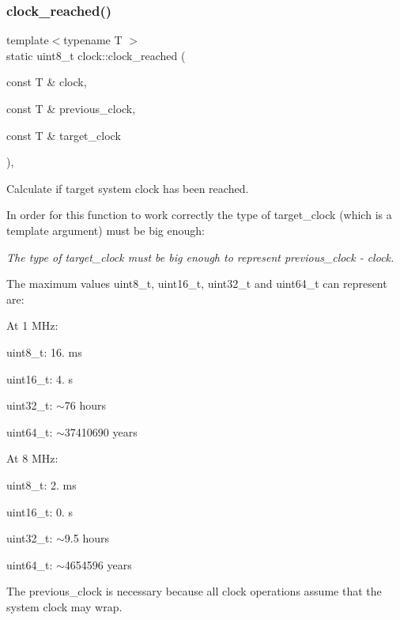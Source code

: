 \subsubsection{\texorpdfstring{clock\+\_\+reached()}{clock\_reached()}\hspace{0.1cm}{\footnotesize\ttfamily [1/2]}}
{\footnotesize\ttfamily template$<$typename T $>$ \\
static uint8\+\_\+t clock\+::clock\+\_\+reached (\begin{DoxyParamCaption}\item[{const T \&}]{clock,  }\item[{const T \&}]{previous\+\_\+clock,  }\item[{const T \&}]{target\+\_\+clock }\end{DoxyParamCaption})\hspace{0.3cm}{\ttfamily [inline]}, {\ttfamily [static]}}



Calculate if target system clock has been reached. 

In order for this function to work correctly the type of target\+\_\+clock (which is a template argument) must be big enough\+:

{\itshape The type of target\+\_\+clock must be big enough to represent {\ttfamily previous\+\_\+clock -\/ clock}.}

The maximum values uint8\+\_\+t, uint16\+\_\+t, uint32\+\_\+t and uint64\+\_\+t can represent are\+:

At 1 M\+Hz\+:
\begin{DoxyItemize}
\item uint8\+\_\+t\+: 16. ms
\item uint16\+\_\+t\+: 4. s
\item uint32\+\_\+t\+: $\sim$76 hours
\item uint64\+\_\+t\+: $\sim$37\textquotesingle{}410\textquotesingle{}690 years
\end{DoxyItemize}

At 8 M\+Hz\+:
\begin{DoxyItemize}
\item uint8\+\_\+t\+: 2. ms
\item uint16\+\_\+t\+: 0. s
\item uint32\+\_\+t\+: $\sim$9.5 hours
\item uint64\+\_\+t\+: $\sim$4\textquotesingle{}654\textquotesingle{}596 years
\end{DoxyItemize}

The previous\+\_\+clock is necessary because all clock operations assume that the system clock may wrap.


